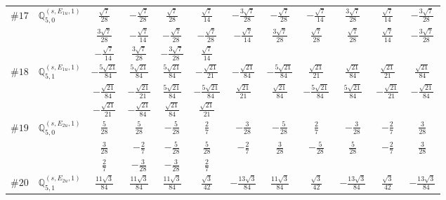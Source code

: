 \documentclass[fleqn,9pt,landscape]{jsarticle}
\begin{document}
\begin{center}
\begin{longtable}{lcccccccccc}
$ \#17\quad \mathbb{Q}_{5,0}^{(s,E_{1u},1)} $ & $ \frac{\sqrt{7}}{28} $ & $ - \frac{\sqrt{7}}{28} $ & $ \frac{\sqrt{7}}{28} $ & $ \frac{\sqrt{7}}{14} $ & $ - \frac{3 \sqrt{7}}{28} $ & $ - \frac{\sqrt{7}}{28} $ & $ - \frac{\sqrt{7}}{14} $ & $ \frac{3 \sqrt{7}}{28} $ & $ \frac{\sqrt{7}}{14} $ & $ - \frac{3 \sqrt{7}}{28} $ \\
& $ \frac{3 \sqrt{7}}{28} $ & $ - \frac{\sqrt{7}}{14} $ & $ - \frac{\sqrt{7}}{28} $ & $ - \frac{\sqrt{7}}{28} $ & $ - \frac{\sqrt{7}}{14} $ & $ \frac{3 \sqrt{7}}{28} $ & $ \frac{\sqrt{7}}{28} $ & $ \frac{\sqrt{7}}{28} $ & $ \frac{\sqrt{7}}{14} $ & $ - \frac{3 \sqrt{7}}{28} $ \\
& $ - \frac{\sqrt{7}}{14} $ & $ \frac{3 \sqrt{7}}{28} $ & $ - \frac{3 \sqrt{7}}{28} $ & $ \frac{\sqrt{7}}{14} $ & $  $ & $  $ & $  $ & $  $ & $  $ & $  $ \\ \hline
$ \#18\quad \mathbb{Q}_{5,1}^{(s,E_{1u},1)} $ & $ - \frac{5 \sqrt{21}}{84} $ & $ \frac{5 \sqrt{21}}{84} $ & $ \frac{5 \sqrt{21}}{84} $ & $ - \frac{\sqrt{21}}{21} $ & $ - \frac{\sqrt{21}}{84} $ & $ - \frac{5 \sqrt{21}}{84} $ & $ \frac{\sqrt{21}}{21} $ & $ \frac{\sqrt{21}}{84} $ & $ \frac{\sqrt{21}}{21} $ & $ \frac{\sqrt{21}}{84} $ \\
& $ - \frac{\sqrt{21}}{84} $ & $ - \frac{\sqrt{21}}{21} $ & $ \frac{5 \sqrt{21}}{84} $ & $ - \frac{5 \sqrt{21}}{84} $ & $ \frac{\sqrt{21}}{21} $ & $ \frac{\sqrt{21}}{84} $ & $ - \frac{5 \sqrt{21}}{84} $ & $ \frac{5 \sqrt{21}}{84} $ & $ - \frac{\sqrt{21}}{21} $ & $ - \frac{\sqrt{21}}{84} $ \\
& $ - \frac{\sqrt{21}}{21} $ & $ - \frac{\sqrt{21}}{84} $ & $ \frac{\sqrt{21}}{84} $ & $ \frac{\sqrt{21}}{21} $ & $  $ & $  $ & $  $ & $  $ & $  $ & $  $ \\ \hline
$ \#19\quad \mathbb{Q}_{5,0}^{(s,E_{2u},1)} $ & $ \frac{5}{28} $ & $ \frac{5}{28} $ & $ - \frac{5}{28} $ & $ \frac{2}{7} $ & $ - \frac{3}{28} $ & $ - \frac{5}{28} $ & $ \frac{2}{7} $ & $ - \frac{3}{28} $ & $ - \frac{2}{7} $ & $ \frac{3}{28} $ \\
& $ \frac{3}{28} $ & $ - \frac{2}{7} $ & $ - \frac{5}{28} $ & $ \frac{5}{28} $ & $ - \frac{2}{7} $ & $ \frac{3}{28} $ & $ - \frac{5}{28} $ & $ \frac{5}{28} $ & $ - \frac{2}{7} $ & $ \frac{3}{28} $ \\
& $ \frac{2}{7} $ & $ - \frac{3}{28} $ & $ - \frac{3}{28} $ & $ \frac{2}{7} $ & $  $ & $  $ & $  $ & $  $ & $  $ & $  $ \\ \hline
$ \#20\quad \mathbb{Q}_{5,1}^{(s,E_{2u},1)} $ & $ \frac{11 \sqrt{3}}{84} $ & $ \frac{11 \sqrt{3}}{84} $ & $ \frac{11 \sqrt{3}}{84} $ & $ \frac{\sqrt{3}}{42} $ & $ - \frac{13 \sqrt{3}}{84} $ & $ \frac{11 \sqrt{3}}{84} $ & $ \frac{\sqrt{3}}{42} $ & $ - \frac{13 \sqrt{3}}{84} $ & $ \frac{\sqrt{3}}{42} $ & $ - \frac{13 \sqrt{3}}{84} $ \\

\end{longtable}
\end{center}
\end{document}

